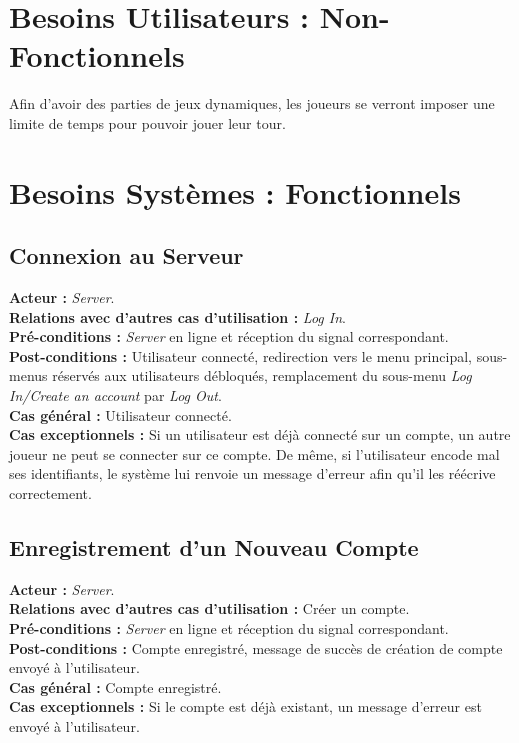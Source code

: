 \documentclass[10pt, a4paper]{article}
\begin{document}
\section{Besoins Utilisateurs : Non-Fonctionnels}
Afin d'avoir des parties de jeux dynamiques, les joueurs se verront imposer une limite de temps pour pouvoir jouer leur tour. \\

\section{Besoins Systèmes : Fonctionnels}

\subsection{Connexion au Serveur}
\textbf{Acteur :} \textit{Server}. \\
\textbf{Relations avec d'autres cas d'utilisation :} \textit{Log In}. \\
\textbf{Pré-conditions :} \textit{Server} en ligne et réception du signal correspondant. \\
\textbf{Post-conditions :} Utilisateur connecté, redirection vers le menu principal, sous-menus réservés aux utilisateurs débloqués, remplacement du sous-menu \textit{Log In/Create an account} par \textit{Log Out}. \\
\textbf{Cas général :} Utilisateur connecté. \\
\textbf{Cas exceptionnels :} Si un utilisateur est déjà connecté sur un compte, un autre joueur ne peut se connecter sur ce compte. De même, si l’utilisateur encode mal ses identifiants, le système lui renvoie un message d’erreur afin qu’il les réécrive correctement. \\

\subsection{Enregistrement d'un Nouveau Compte}
\textbf{Acteur :} \textit{Server}. \\
\textbf{Relations avec d'autres cas d'utilisation :} Créer un compte. \\
\textbf{Pré-conditions :} \textit{Server} en ligne et réception du signal correspondant. \\
\textbf{Post-conditions :} Compte enregistré, message de succès de création de compte envoyé à l'utilisateur. \\
\textbf{Cas général :} Compte enregistré. \\
\textbf{Cas exceptionnels :} Si le compte est déjà existant, un message d'erreur est envoyé à l'utilisateur. \\
\end{document}
